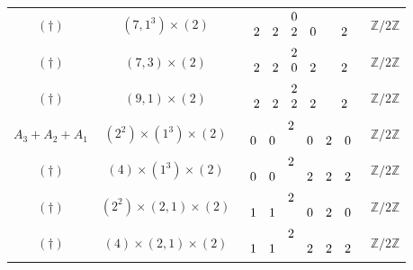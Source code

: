 \documentclass[11pt]{amsart}
\newcommand{\bZ}{{\mathbb Z}}
\numberwithin{equation}{section}
\begin{document}
\begin{center}
\begin{longtable}{|c|c|c|c|}
			$(\dagger)$ & $(7,1^3)\times (2)$ & $\renewcommand{\arraystretch}{}\begin{array}{c c c c c c}
				&  & 0 & & & \\
				2 & 2 & 2 & 0 & & 2   \\
			\end{array}$ & $\bZ/2\bZ$ \\
			$(\dagger)$ & $(7,3)\times (2)$ & $\renewcommand{\arraystretch}{}\begin{array}{c c c c c c}
				&  & 2 & & & \\
				2 & 2 & 0 & 2 & & 2   \\
			\end{array}$ & $\bZ/2\bZ$ \\
			$(\dagger)$ & $(9,1)\times (2)$ & $\renewcommand{\arraystretch}{}\begin{array}{c c c c c c}
				&  & 2 & & & \\
				2 & 2 & 2 & 2 & & 2   \\
			\end{array}$ & $\bZ/2\bZ$ \\
			\hline
			$A_3+A_2+A_1$ & $(2^2)\times (1^3)\times (2)$ & $\renewcommand{\arraystretch}{}\begin{array}{c c c c c c}
				&  & 2 & & & \\
				0 & 0  &  & 0 & 2 & 0   \\
			\end{array}$ & $\bZ/2\bZ$\\
			$(\dagger)$ & $(4)\times (1^3)\times (2)$ & $\renewcommand{\arraystretch}{}\begin{array}{c c c c c c}
				&  & 2 & & & \\
				0 & 0 &  & 2 & 2 & 2   \\
			\end{array}$ & $\bZ/2\bZ$\\
			$(\dagger)$ & $(2^2)\times (2,1)\times (2)$ & $\renewcommand{\arraystretch}{}\begin{array}{c c c c c c}
				&  & 2 & & & \\
				1 &  1 &  & 0 & 2 & 0   \\
			\end{array}$ & $\bZ/2\bZ$\\
			$(\dagger)$ & $(4)\times (2,1)\times (2)$ & $\renewcommand{\arraystretch}{}\begin{array}{c c c c c c}
				&  & 2 & & & \\
				1 & 1 &  & 2 & 2 & 2   \\
			\end{array}$ & $\bZ/2\bZ$\\

\end{longtable}
\end{center}
\end{document}
